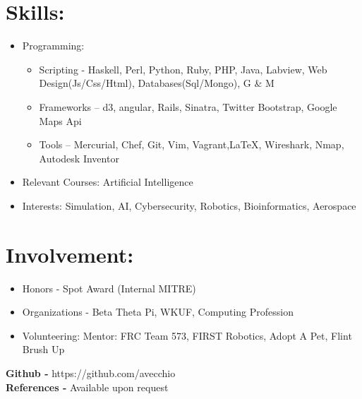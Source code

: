 \documentclass{res}
\begin{document}
\section{Skills:}
\begin{itemize}
\item Programming:
\begin{itemize}[label=$\circ$]
\item Scripting - Haskell, Perl, Python, Ruby, PHP, Java, Labview, Web Design(Js/Css/Html), Databases(Sql/Mongo), G \& M
\item Frameworks – d3, angular, Rails, Sinatra, Twitter Bootstrap, Google Maps Api
\item Tools – Mercurial, Chef, Git, Vim, Vagrant,\LaTeX, Wireshark, Nmap, Autodesk Inventor
\end{itemize}
\item Relevant Courses: Artificial Intelligence
\item Interests: Simulation, AI, Cybersecurity, Robotics, Bioinformatics, Aerospace
\end{itemize}

\section{Involvement:}
\begin{itemize}
\item Honors - Spot Award (Internal MITRE)
\item Organizations - Beta Theta Pi, WKUF, Computing Profession
\item Volunteering: Mentor: FRC Team 573, FIRST Robotics, Adopt A Pet, Flint Brush Up
\end{itemize}

\begin{center}
\textbf{Github - }https://github.com/avecchio\\
\textbf{References - }Available upon request
\end{center}
\end{document}
